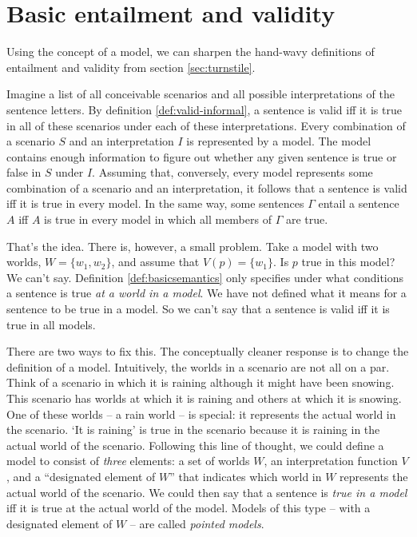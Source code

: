 \section{Basic entailment and validity}%
\label{sec:redefining}

Using the concept of a model, we can sharpen the hand-wavy definitions of
entailment and validity from section \ref{sec:turnstile}.

Imagine a list of all conceivable scenarios and all possible interpretations of
the sentence letters. By definition \ref{def:valid-informal}, a sentence is
valid iff it is true in all of these scenarios under each of these
interpretations. Every combination of a scenario $S$ and an interpretation $I$
is represented by a model. The model contains enough information to figure out
whether any given sentence is true or false in $S$ under $I$. Assuming that,
conversely, every model represents some combination of a scenario and an
interpretation, it follows that a sentence is valid iff it is true in every
model. In the same way, some sentences $\Gamma$ entail a sentence $A$ iff $A$ is
true in every model in which all members of $\Gamma$ are true.

That's the idea. There is, however, a small problem. Take a model with two
worlds, $W = \{ w_{1}, w_{2} \}$, and assume that $V(p) = \{ w_{1} \}$. Is $p$
true in this model? We can't say. Definition \ref{def:basicsemantics} only
specifies under what conditions a sentence is true \emph{at a world in a model}.
We have not defined what it means for a sentence to be true in a model. So we
can't say that a sentence is valid iff it is true in all models.

There are two ways to fix this. The conceptually cleaner response is to change
the definition of a model. Intuitively, the worlds in a scenario are not all on
a par. Think of a scenario in which it is raining although it might have been
snowing. This scenario has worlds at which it is raining and others at which it
is snowing. One of these worlds -- a rain world -- is special: it represents the
actual world in the scenario. `It is raining' is true in the scenario because it
is raining in the actual world of the scenario. Following this line of thought,
we could define a model to consist of \emph{three} elements: a set of worlds
$W$, an interpretation function $V$, and a ``designated element of $W$'' that
indicates which world in $W$ represents the actual world of the scenario. We
could then say that a sentence is \emph{true in a model} iff it is true at the
actual world of the model. Models of this type -- with a designated element of
$W$ -- are called \emph{pointed models}.

